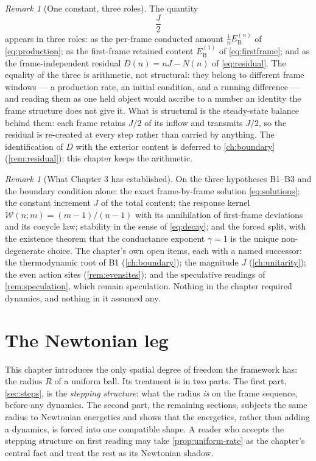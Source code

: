 \documentclass[11pt]{amsbook}
\theoremstyle{plain}
\theoremstyle{definition}
\theoremstyle{remark}
\newtheorem{remark}[theorem]{Remark}
\begin{document}
\begin{remark}[One constant, three roles]\label{rem:threenames}
The quantity
\begin{equation}\label{eq:Jhalf}
\frac{J}{2}
\end{equation}
appears in three roles: as the per-frame conducted amount $\frac1n E_{\mathrm B}^{(n)}$ of \cref{eq:production}; as the first-frame retained content $E_{\mathrm B}^{(1)}$ of \cref{eq:firstframe}; and as the frame-independent residual $D(n) = nJ - N(n)$ of \cref{eq:residual}. The equality of the three is arithmetic, not structural: they belong to different frame windows --- a production rate, an initial condition, and a running difference --- and reading them as one held object would ascribe to a number an identity the frame structure does not give it. What is structural is the steady-state balance behind them: each frame retains $J/2$ of its inflow and transmits $J/2$, so the residual is re-created at every step rather than carried by anything. The identification of $D$ with the exterior content is deferred to \cref{ch:boundary} (\cref{rem:residual}); this chapter keeps the arithmetic.
\end{remark}

\begin{remark}[What Chapter 3 has established]\label{rem:ch3summary}
On the three hypotheses B1--B3 and the boundary condition alone: the exact frame-by-frame solution \cref{eq:solutions}; the constant increment $J$ of the total content; the response kernel $\mathcal{W}(n;m) = (m-1)/(n-1)$ with its annihilation of first-frame deviations and its cocycle law; stability in the sense of \cref{eq:decay}; and the forced split, with the existence theorem that the conductance exponent $\gamma = 1$ is the unique non-degenerate choice. The chapter's own open items, each with a named successor: the thermodynamic root of B1 (\cref{ch:boundary}); the magnitude $J$ (\cref{ch:unitarity}); the even action sites (\cref{rem:evensites}); and the speculative readings of \cref{rem:speculation}, which remain speculation. Nothing in the chapter required dynamics, and nothing in it assumed any.
\end{remark}

\chapter{The Newtonian leg}\label{ch:newton}

This chapter introduces the only spatial degree of freedom the framework has: the radius $R$ of a uniform ball. Its treatment is in two parts. The first part, \cref{sec:steps}, is the \emph{stepping structure}: what the radius \emph{is} on the frame sequence, before any dynamics. The second part, the remaining sections, subjects the same radius to Newtonian energetics and shows that the energetics, rather than adding a dynamics, is forced into one compatible shape. A reader who accepts the stepping structure on first reading may take \cref{prop:uniform-rate} as the chapter's central fact and treat the rest as its Newtonian shadow.
\end{document}
